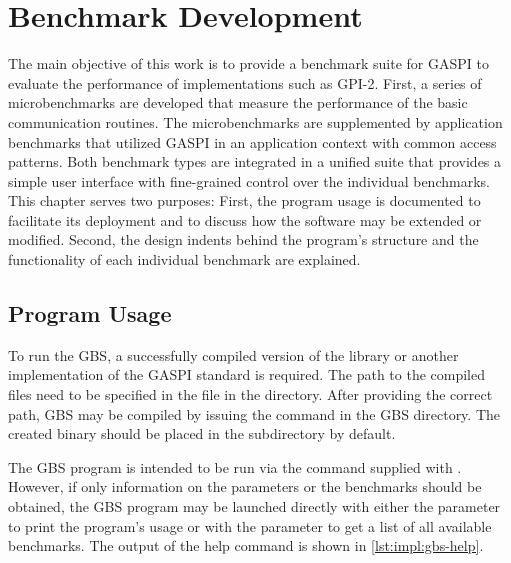 
\chapter{Benchmark Development}

The main objective of this work is to provide a benchmark suite for \ac{GASPI} to evaluate the performance of implementations such as \acs{GPI}-2. First, a series of microbenchmarks are developed that measure the performance of the basic communication routines. The microbenchmarks are supplemented by application benchmarks that utilized \ac{GASPI} in an application context with common access patterns. Both benchmark types are integrated in a unified suite that provides a simple user interface with fine-grained control over the individual benchmarks. This chapter serves two purposes: First, the program usage is documented to facilitate its deployment and to discuss how the software may be extended or modified. Second, the design indents behind the program's structure and the functionality of each individual benchmark are explained.

\section{Program Usage}

To run the \ac{GBS}, a successfully compiled version of the \gpi library or another implementation of the \ac{GASPI} standard is required. The path to the compiled \gpi files need to be specified in the file  in the  directory. After providing the correct path, \ac{GBS} may be compiled by issuing the  command in the \ac{GBS} directory. The created binary should be placed in the subdirectory  by default.

The \ac{GBS} program  is intended to be run via the  command supplied with \gpi. However, if only information on the parameters or the benchmarks should be obtained, the \ac{GBS} program may be launched directly with either the  parameter to print the program's usage or with the  parameter to get a list of all available benchmarks. The output of the help command is shown in \autoref{lst:impl:gbs-help}.

